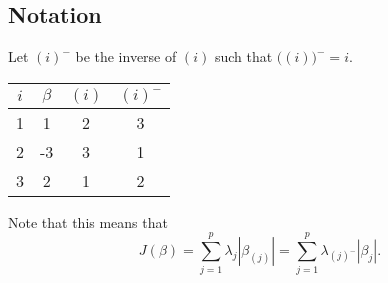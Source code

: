 \subsection{Notation}\label{sec:notation}

Let \((i)^{-}\) be the inverse of \((i)\) such that
\(\big((i)\big)^- = i\).
\begin{example}
  \begin{tabular}{cccc}
    \toprule
    \(i\) & \(\beta\) & \((i)\) & \((i)^-\) \\
    \midrule
    1     & 1         & 2       & 3         \\
    2     & -3        & 3       & 1         \\
    3     & 2         & 1       & 2         \\
    \bottomrule
  \end{tabular}
\end{example}
Note that this means that
\[
  J(\beta) = \sum_{j=1}^p \lambda_j |\beta_{(j)}|
           = \sum_{j=1}^p \lambda_{(j)^-}|\beta_j|.
\]
